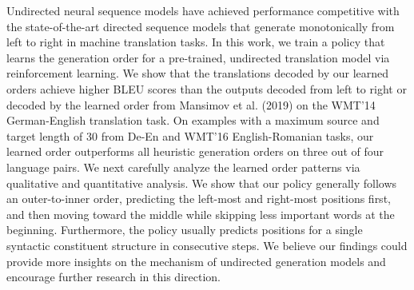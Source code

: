Undirected neural sequence models have achieved performance competitive with the state-of-the-art directed sequence models that generate monotonically from left to right in machine translation tasks. In this work, we train a policy that learns the generation order for a pre-trained, undirected translation model via reinforcement learning. We show that the translations decoded by our learned orders achieve higher BLEU scores than the outputs decoded from left to right or decoded by the learned order from Mansimov et al. (2019) on the WMT'14 German-English translation task. On examples with a maximum source and target length of 30 from De-En and WMT'16 English-Romanian tasks, our learned order outperforms all heuristic generation orders on three out of four language pairs. We next carefully analyze the learned order patterns via qualitative and quantitative analysis. We show that our policy generally follows an outer-to-inner order, predicting the left-most and right-most positions first, and then moving toward the middle while skipping less important words at the beginning. Furthermore, the policy usually predicts positions for a single syntactic constituent structure in consecutive steps. We believe our findings could provide more insights on the mechanism of undirected generation models and encourage further research in this direction.
